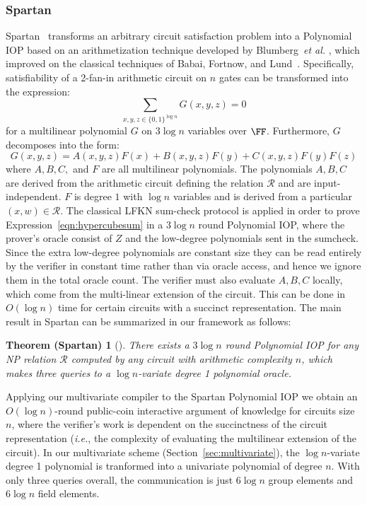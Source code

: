 
\subsubsection{Spartan}
\textsf{Spartan}~\cite{Spartan} transforms an arbitrary circuit satisfaction problem into a Polynomial IOP based on an arithmetization technique developed by Blumberg~\emph{et al.} \cite{EPRINT:BTVW14}, which improved on the classical techniques of Babai, Fortnow, and Lund~\cite{BFL}. Specifically, satisfiability of a 2-fan-in arithmetic circuit on $n$ gates can be transformed into the expression: 
\begin{equation}\label{eqn:hypercubesum}
\sum_{x, y, z \in \{0,1\}^{\log n}} G(x, y, z) = 0
\end{equation} 
for a multilinear polynomial $G$ on $3 \log n$ variables over $\FF$. 
Furthermore, $G$ decomposes into the form: 
$$G(x,y,z) = A(x,y,z) F(x) + B(x, y, z) F(y) + C(x, y, z) F(y) F(z)$$
where $A, B, C,$ and $F$ are all multilinear polynomials. The polynomials $A, B, C$ are derived from the arithmetic circuit defining the relation $\mathcal{R}$ and are input-independent. $F$ is degree $1$ with $\log n$ variables and is derived from a particular $(x, w) \in \mathcal{R}$. The classical LFKN sum-check protocol %
is applied in order to prove Expression~\ref{eqn:hypercubesum} in a $3\log n$ round Polynomial IOP, where the prover's oracle consist of $Z$ and the low-degree polynomials sent in the sumcheck. Since the extra low-degree polynomials are constant size they can be read entirely by the verifier in constant time rather than via oracle access, and hence we ignore them in the total oracle count. The verifier must also evaluate $A, B, C$ locally, which come from the multi-linear extension of the circuit. This can be done in $O(\log n )$ time for certain circuits with a succinct representation. The main result in Spartan can be summarized in our framework as follows: 
\newtheorem*{spartantheorem}{Theorem (Spartan)}
\begin{spartantheorem}[\cite{Spartan}]
There exists a $3 \log n$ round Polynomial IOP for any NP relation $\mathcal{R}$ computed by any circuit with arithmetic complexity $n$, which makes three queries to a $\log n$-variate degree 1 polynomial oracle. %
\end{spartantheorem}

Applying our multivariate compiler to the \textsf{Spartan} Polynomial IOP we obtain an $O(\log n)$-round public-coin interactive argument of knowledge for circuits size $n$, where the verifier's work is dependent on the succinctness of the circuit representation (\emph{i.e.}, the complexity of evaluating the multilinear extension of the circuit). In our multivariate scheme (Section~\ref{sec:multivariate}), the $\log n$-variate degree 1 polynomial is tranformed into a univariate polynomial of degree $n$. With only three queries overall, the communication is just $6 \log n$ group elements and $6 \log n$ field elements. 


